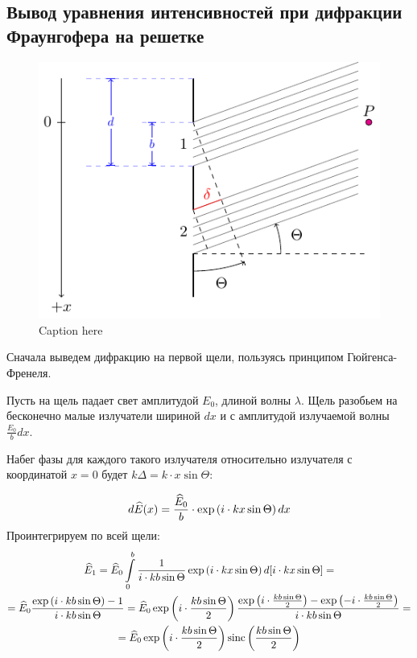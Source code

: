 \subsection{Вывод уравнения интенсивностей при дифракции Фраунгофера на решетке}

\begin{figure}[H]
	\centering
	\includegraphics[]{ris/diff}
	\caption{Caption here}
	\label{fig:figure1}
\end{figure}

Сначала выведем дифракцию на первой щели, пользуясь принципом Гюйгенса-Френеля. 

Пусть на щель падает свет амплитудой $E_0$, длиной волны $\lambda$.  Щель разобьем на бесконечно малые излучатели шириной $dx$ и с амплитудой излучаемой волны $\frac{E_0}{b}dx$.  

Набег фазы для каждого такого излучателя относительно излучателя с координатой $x=0$ будет $k\Delta=k\cdot x \sin\Theta$:

\begin{equation}
	d\widehat{E}(x)=\frac{\widehat{E}_0}{b}\cdot\exp\left(i\cdot k x \sin\Theta\right) dx
\end{equation}
Проинтегрируем по всей щели:
\begin{gather}
	\widehat{E}_{1}=\widehat{E}_0\int\limits_0^b \frac{1}{i\cdot kb\sin\Theta} \exp\left(i\cdot k x \sin\Theta\right) d[i\cdot k x \sin\Theta]=\\=
	\widehat{E}_0 \frac{\exp\left(i\cdot k b \sin\Theta\right)-1}{i\cdot kb\sin\Theta}=
	\widehat{E}_0\exp\left(i\cdot \frac{k b \sin\Theta}{2}\right) \frac{\exp\left(i\cdot \frac{k b \sin\Theta}{2}\right)-\exp\left(-i\cdot \frac{k b \sin\Theta}{2}\right)}{i\cdot kb\sin\Theta}=\\=
	\widehat{E}_0\exp\left(i\cdot \frac{k b \sin\Theta}{2}\right) \operatorname{sinc}\left(\frac{k b \sin\Theta}{2}\right)
\end{gather}

